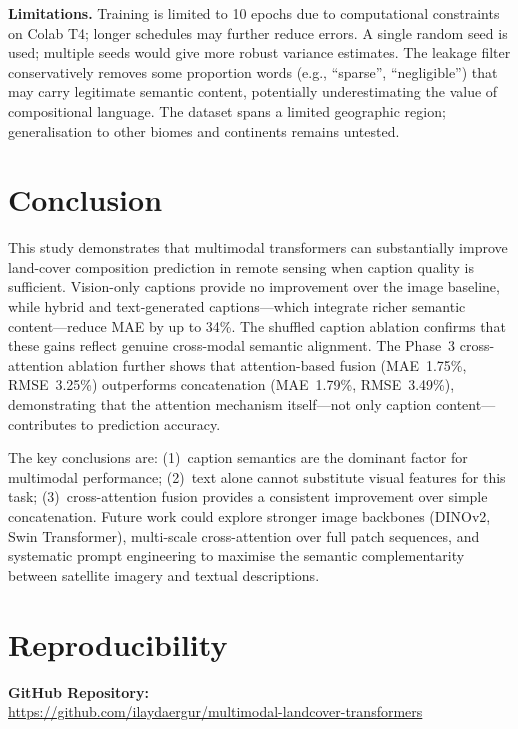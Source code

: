\documentclass[conference]{IEEEtran}
\begin{document}
\textbf{Limitations.}
Training is limited to 10 epochs due to computational constraints on Colab T4; longer
schedules may further reduce errors. A single random seed is used; multiple seeds would
give more robust variance estimates. The leakage filter conservatively removes some
proportion words (e.g., ``sparse'', ``negligible'') that may carry legitimate semantic
content, potentially underestimating the value of compositional language. The dataset
spans a limited geographic region; generalisation to other biomes and continents remains
untested.

\section{Conclusion}

This study demonstrates that multimodal transformers can substantially improve
land-cover composition prediction in remote sensing when caption quality is sufficient.
Vision-only captions provide no improvement over the image baseline, while hybrid and
text-generated captions---which integrate richer semantic content---reduce MAE by up to
34\%. The shuffled caption ablation confirms that these gains reflect genuine cross-modal
semantic alignment. The Phase~3 cross-attention ablation further shows that
attention-based fusion (MAE~1.75\%, RMSE~3.25\%) outperforms concatenation
(MAE~1.79\%, RMSE~3.49\%), demonstrating that the attention mechanism itself---not
only caption content---contributes to prediction accuracy.

The key conclusions are: (1)~caption semantics are the dominant factor for multimodal
performance; (2)~text alone cannot substitute visual features for this task;
(3)~cross-attention fusion provides a consistent improvement over simple concatenation.
Future work could explore stronger image backbones (DINOv2, Swin Transformer),
multi-scale cross-attention over full patch sequences, and systematic prompt engineering
to maximise the semantic complementarity between satellite imagery and textual
descriptions.

\section{Reproducibility}

\textbf{GitHub Repository:}\\
\url{https://github.com/ilaydaergur/multimodal-landcover-transformers}
\end{document}
